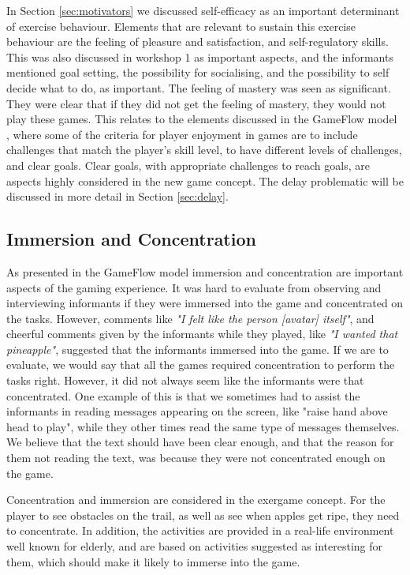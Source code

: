 In Section \ref{sec:motivators} we discussed self-efficacy as an important determinant of exercise behaviour. Elements that are relevant to sustain this exercise behaviour are the feeling of pleasure and satisfaction, and self-regulatory skills. This was also discussed in workshop 1 as important aspects, and the informants mentioned goal setting, the possibility for socialising, and the possibility to self decide what to do, as important. The feeling of mastery was seen as significant. They were clear that if they did not get the feeling of mastery, they would not play these games. This relates to the elements discussed in the GameFlow model \cite{sweetser}, where some of the criteria for player enjoyment in games are to include challenges that match the player's skill level, to have different levels of challenges, and clear goals. Clear goals, with appropriate challenges to reach goals, are aspects highly considered in the new game concept. The delay problematic will be discussed in more detail in Section \ref{sec:delay}.
 
\subsection{Immersion and Concentration}
As presented in the GameFlow model \cite{sweetser} immersion and concentration are important aspects of the gaming experience. It was hard to evaluate from observing and interviewing informants if they were immersed into the game and concentrated on the tasks. However, comments like \emph{"I felt like the person [avatar] itself"}, and cheerful comments given by the informants while they played, like \emph{"I wanted that pineapple"}, suggested that the informants immersed into the game. If we are to evaluate, we would say that all the games required concentration to perform the tasks right. However, it did not always seem like the informants were that concentrated. One example of this is that we sometimes had to assist the informants in reading messages appearing on the screen, like "raise hand above head to play", while they other times read the same type of messages themselves. We believe that the text should have been clear enough, and that the reason for them not reading the text, was because they were not concentrated enough on the game. 

Concentration and immersion are considered in the exergame concept. For the player to see obstacles on the trail, as well as see when apples get ripe, they need to concentrate. In addition, the activities are provided in a real-life environment well known for elderly, and are based on activities suggested as interesting for them, which should make it likely to immerse into the game.

